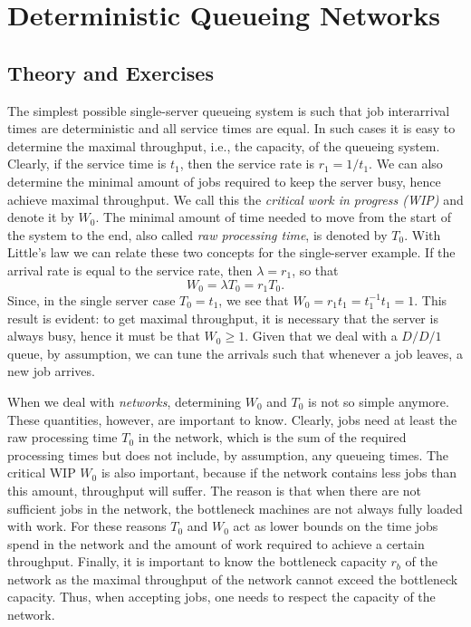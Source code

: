 
\section{Deterministic Queueing Networks}
\label{sec:determ-queu-netw}

\subsection*{Theory and Exercises}


The simplest possible single-server queueing system is such that job
interarrival times are deterministic and all service times are
equal. In such cases it is easy to determine the maximal throughput,
i.e., the capacity, of the queueing system. Clearly, if the service
time is $t_1$, then the service rate is $r_1 = 1/t_1$. We can also
determine the minimal amount of jobs required to keep the server busy,
hence achieve maximal throughput.  We call this the \emph{critical
  work in progress (WIP)} and denote it by $W_0$. The minimal amount
of time needed to move from the start of the system to the end, also
called \emph{raw processing time}, is denoted by $T_0$.  With Little's
law we can relate these two concepts for the single-server example.
If the arrival rate is equal to the service rate, then
$\lambda = r_1$, so that
\begin{equation*}
  W_0 = \lambda T_0 = r_1 T_0.
\end{equation*}
Since, in the single server case $T_0 = t_1$, we see that
$W_0=r_1 t_1 = t_1^{-1}t_1 = 1$. This result is evident: to get
maximal throughput, it is necessary that the server is always busy,
hence it must be that $W_0\geq 1$. Given that we deal with a $D/D/1$ queue,
by assumption, we can tune the arrivals such that whenever a job
leaves, a new job arrives.

When we deal with \emph{networks}, determining $W_0$ and $T_0$ is not
so simple anymore. These quantities, however, are important to
know. Clearly,  jobs need at least the raw processing time $T_0$ in the network, which is the sum of the required processing times but does not include, by assumption, any queueing times. The critical WIP $W_0$ is also important, because if the network contains less jobs than this amount, throughput
will suffer. The reason is that when there are  not sufficient jobs in the
network, the bottleneck machines are not always fully loaded with work. For these
reasons $T_0$ and $W_0$ act as lower bounds on the time jobs spend in
the network and the amount of work required to achieve a certain
throughput.  Finally, it is important to know the bottleneck capacity
$r_b$ of the network as the maximal throughput of the network cannot
exceed the bottleneck capacity. Thus, when accepting jobs, one needs
to respect the capacity of the network. 

